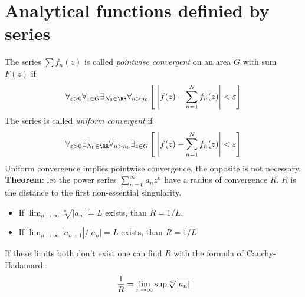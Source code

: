 \section{Analytical functions definied by series}
The series $\sum f_n(z)$ is called {\it pointwise convergent} on an area $G$
with sum $F(z)$ if
\[
\forall_{\varepsilon>0}\forall_{z\in G}\exists_{N_0\in\RR}\forall_{n>n_0}
\left[~\left|f(z)-\sum_{n=1}^Nf_n(z)\right|<\varepsilon\right]
\]
The series is called {\it uniform convergent} if
\[
\forall_{\varepsilon>0}\exists_{N_0\in\RR}\forall_{n>n_0}\exists_{z\in G}
\left[~\left|f(z)-\sum_{n=1}^Nf_n(z)\right|<\varepsilon\right]
\]
Uniform convergence implies pointwise convergence, the opposite is not
necessary.
\npar
{\bf Theorem}: let the power series $\sum\limits_{n=0}^\infty a_nz^n$ have
a radius of convergence $R$. $R$ is the distance to the first non-essential
singularity.
\begin{itemize}
\item If $\displaystyle\lim_{n\rightarrow\infty}\sqrt[n]{|a_n|}=L$ exists, than $R=1/L$.
\item If $\displaystyle\lim_{n\rightarrow\infty}|a_{n+1}|/|a_n|=L$ exists, than $R=1/L$.
\end{itemize}
If these limits both don't exist one can find $R$ with the formula of
Cauchy-Hadamard:
\[
\frac{1}{R}=\lim_{n\rightarrow\infty}{\rm sup}\sqrt[n]{|a_n|}
\]

